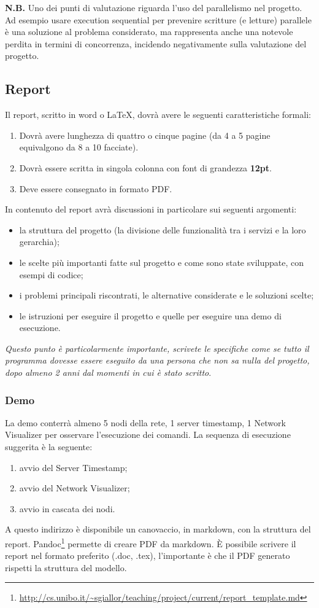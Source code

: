 \documentclass[12pt,a4paper,draft]{article}
\begin{document}
\textbf{N.B.} Uno dei punti di valutazione riguarda l'uso del parallelismo nel progetto. 
Ad esempio usare execution { sequential } per prevenire scritture (e letture) parallele è una soluzione al problema considerato, ma rappresenta anche una notevole perdita in termini di concorrenza, incidendo negativamente sulla valutazione del progetto.

\subsection{Report}
Il report, scritto in word o \LaTeX, dovrà avere le seguenti caratteristiche formali:
\begin{enumerate}
    \item Dovrà avere lunghezza di quattro o cinque pagine (da 4 a 5 pagine equivalgono da 8 a 10 facciate).
    \item Dovrà essere scritta in singola colonna con font di grandezza \textbf{12pt}.
    \item Deve essere consegnato in formato PDF.
\end{enumerate}
In contenuto del report avrà discussioni in particolare sui seguenti argomenti:
\begin{itemize}
    \item la struttura del progetto (la divisione delle funzionalità tra i servizi e la loro gerarchia);
    \item le scelte più importanti fatte sul progetto e come sono state sviluppate, con esempi di codice;
    \item i problemi principali riscontrati, le alternative considerate e le soluzioni scelte;
    \item le istruzioni per eseguire il progetto e quelle per eseguire una demo di esecuzione. 
\end{itemize}
\textit{Questo punto è particolarmente importante, scrivete le specifiche come se tutto il programma dovesse essere eseguito da una persona che non sa nulla del progetto, dopo almeno 2 anni dal momenti in cui è stato scritto}.

\subsubsection{Demo}
La demo conterrà almeno 5 nodi della rete, 1 server timestamp, 1 Network Visualizer per osservare l'esecuzione dei comandi.
La sequenza di esecuzione suggerita è la seguente:
\begin{enumerate}
    \item avvio del Server Timestamp;
    \item avvio del Network Visualizer;
    \item avvio in cascata dei nodi.
\end{enumerate}
A questo indirizzo è disponibile un canovaccio, in markdown, con la struttura del report. 
Pandoc\footnote{\url{http://cs.unibo.it/~sgiallor/teaching/project/current/report_template.md}} permette di creare PDF da markdown. 
È possibile scrivere il report nel formato preferito (.doc, .tex), l'importante è che il PDF generato rispetti la struttura del modello.
%
\end{document}
